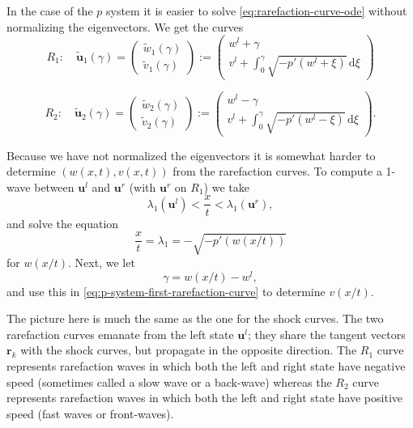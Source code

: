 In the case of the $p$ system it is easier to solve \eqref{eq:rarefaction-curve-ode} without normalizing the eigenvectors. We get the curves
\begin{equation}\label{eq:p-system-first-rarefaction-curve}
R_1:\quad\tilde{\bm{u}}_1(\gamma)=\begin{pmatrix}\tilde w_1(\gamma)\\\tilde v_1(\gamma)\end{pmatrix}:=\begin{pmatrix}w^l+\gamma\\v^l+\int_0^\gamma\sqrt{-p'(w^l+\xi)}\,\mathrm{d}\xi\end{pmatrix}
\end{equation}

\begin{equation}\label{eq:p-system-second-rarefaction-curve}
R_2:\quad\tilde{\bm{u}}_2(\gamma)=\begin{pmatrix}\tilde w_2(\gamma)\\\tilde v_2(\gamma)\end{pmatrix}:=\begin{pmatrix}w^l-\gamma\\v^l+\int_0^\gamma\sqrt{-p'(w^l-\xi)}\,\mathrm{d}\xi\end{pmatrix}.
\end{equation}


Because we have not normalized the eigenvectors it is somewhat harder to determine $(w(x,t),v(x,t))$ from the rarefaction curves. To compute a 1-wave between $\bm{u}^l$ and $\bm{u}^r$ (with $\bm{u}^r$ on $R_1$) we take
\begin{equation}\label{eq:p-system-first-rarefaction-speed-range}
\lambda_1(\bm{u}^l)<\dfrac{x}{t}<\lambda_1(\bm{u}^r),
\end{equation}
and solve the equation
\begin{equation}\label{eq:p-system-first-rarefaction-volume}
\dfrac{x}{t}=\lambda_1=-\sqrt{-p'(w(x/t))}
\end{equation}
for $w(x/t)$. Next, we let
\begin{equation}\label{eq:p-system-first-rarefaction-parameter}
\gamma=w(x/t)-w^l,
\end{equation}
and use this in \eqref{eq:p-system-first-rarefaction-curve} to determine $v(x/t)$.

The picture here is much the same as the one for the shock curves. The two rarefaction curves emanate from the left state $\bm{u}^l$; they share the tangent vectors $\bm{r}_k$ with the shock curves, but propagate in the opposite direction. The $R_1$ curve represents rarefaction waves in which both the left and right state have negative speed (sometimes called a slow wave or a back-wave) whereas the $R_2$ curve represents rarefaction waves in which both the left and right state have positive speed (fast waves or front-waves).

